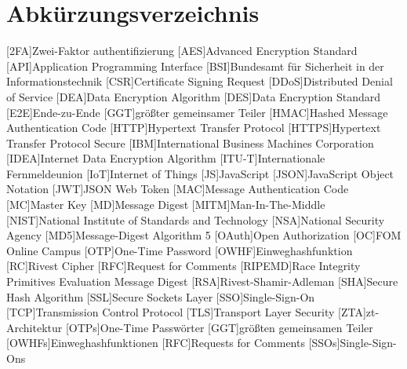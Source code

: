 \section*{Abkürzungsverzeichnis}


\begin{acronym}
[RIPEMD]\itemsep0pt %
[2FA]{Zwei-Faktor \gls{authentifizierung}}
[AES]{Advanced Encryption Standard}
[API]{Application Programming Interface}
[BSI]{Bundesamt für Sicherheit in der Informationstechnik}
[CSR]{Certificate Signing Request}
[DDoS]{Distributed Denial of Service}
[DEA]{Data Encryption Algorithm}
[DES]{Data Encryption Standard}
[E2E]{Ende-zu-Ende}
[GGT]{größter gemeinsamer Teiler}
[HMAC]{Hashed Message Authentication Code}
[HTTP]{Hypertext Transfer Protocol}
[\acs{HTTP}S]{Hypertext Transfer Protocol Secure}
[IBM]{International Business Machines Corporation}
[IDEA]{Internet Data Encryption Algorithm}
[ITU-T]{Internationale Fernmeldeunion}
[IoT]{Internet of Things}
[JS]{JavaScript}
[JSON]{JavaScript Object Notation}
[JWT]{JSON Web Token}
[MAC]{Message Authentication Code}
[MC]{Master Key}
[MD]{Message Digest}
[MITM]{Man-In-The-Middle}
[NIST]{National Institute of Standards and Technology}
[NSA]{National Security Agency}
[MD5]{Message-Digest Algorithm 5}
[OAuth]{Open Authorization}
[OC]{FOM Online Campus}
[OTP]{One-Time Password}
[OWHF]{Einweghashfunktion}
[RC]{Rivest Cipher}
[RFC]{Request for Comments}
[RIPEMD]{Race Integrity Primitives Evaluation Message Digest}
[RSA]{Rivest-Shamir-Adleman}
[SHA]{Secure Hash Algorithm}
[SSL]{Secure Sockets Layer}
[SSO]{Single-Sign-On}
[TCP]{Transmission Control Protocol}
[TLS]{Transport Layer Security}
[ZTA]{\acl{zt}-Architektur}
[OTPs]{One-Time Passwörter}
[GGT]{größten gemeinsamen Teiler}
[OWHFs]{Einweghashfunktionen}
[RFC]{Requests for Comments}
[SSOs]{Single-Sign-Ons}
\end{acronym}